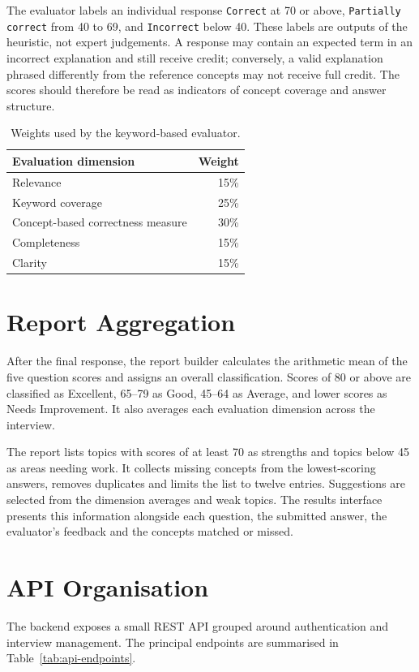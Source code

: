 \documentclass[12pt,a4paper,oneside]{report}
\begin{document}
The evaluator labels an individual response \texttt{Correct} at 70 or above, \texttt{Partially correct} from 40 to 69, and \texttt{Incorrect} below 40. These labels are outputs of the heuristic, not expert judgements. A response may contain an expected term in an incorrect explanation and still receive credit; conversely, a valid explanation phrased differently from the reference concepts may not receive full credit. The scores should therefore be read as indicators of concept coverage and answer structure.

\begin{table}[H]
\centering
\small
\begin{tabularx}{0.86\textwidth}{>{\RaggedRight\arraybackslash}X r}
\toprule
\textbf{Evaluation dimension} & \textbf{Weight} \\
\midrule
Relevance & 15\% \\
Keyword coverage & 25\% \\
Concept-based correctness measure & 30\% \\
Completeness & 15\% \\
Clarity & 15\% \\
\bottomrule
\end{tabularx}
\caption{Weights used by the keyword-based evaluator.}
\label{tab:evaluation-weights}
\end{table}

\section{Report Aggregation}
After the final response, the report builder calculates the arithmetic mean of the five question scores and assigns an overall classification. Scores of 80 or above are classified as Excellent, 65--79 as Good, 45--64 as Average, and lower scores as Needs Improvement. It also averages each evaluation dimension across the interview.

The report lists topics with scores of at least 70 as strengths and topics below 45 as areas needing work. It collects missing concepts from the lowest-scoring answers, removes duplicates and limits the list to twelve entries. Suggestions are selected from the dimension averages and weak topics. The results interface presents this information alongside each question, the submitted answer, the evaluator's feedback and the concepts matched or missed.

\section{API Organisation}
The backend exposes a small REST API grouped around authentication and interview management. The principal endpoints are summarised in Table~\ref{tab:api-endpoints}.
\end{document}
